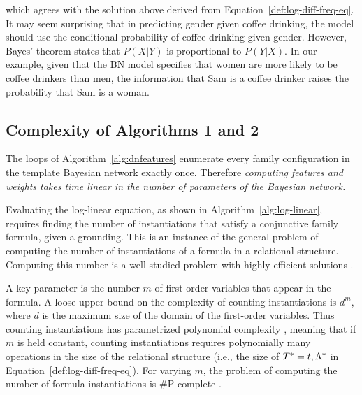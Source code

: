 \documentclass[runningheads,a4paper]{llncs}
\renewcommand{\Qconj}{\Appendterm{\FG{\TT} = \TV} {\QC}} %
\begin{document}
\noindent which agrees with the solution above derived from Equation~\eqref{def:log-diff-freq-eq}. It may seem surprising that in predicting gender given coffee drinking, the model should use the conditional probability of coffee drinking given gender. However, Bayes' theorem states that $P(X|Y)$ is proportional to $P(Y|X)$. In our example, given that the BN model specifies that women are more likely to be coffee drinkers than men, the information that Sam is a coffee drinker raises the probability that Sam is a woman. 

\subsection{Complexity of Algorithms 1 and 2} \label{sec:complexity}
The loops of Algorithm~\ref{alg:dnfeatures} enumerate every family configuration in the template Bayesian network exactly once. Therefore {\em computing features and weights takes time linear in the number of parameters of the Bayesian network.} 

Evaluating the log-linear equation, as shown in Algorithm~\ref{alg:log-linear}, requires finding the number of instantiations that satisfy a conjunctive family formula, given a grounding. This is an instance of the general problem of computing the number of instantiations of a formula in a relational structure. Computing this number is a well-studied problem  with highly efficient solutions \cite{Vardi1995,Schulte2014}. 

A key parameter is the number $m$ of first-order variables that appear in the formula. A loose upper bound on the complexity of counting instantiations is $d^{m}$, where $d$ is the maximum size of the domain of the first-order variables. Thus counting instantiations has parametrized polynomial complexity \cite{Flum2006}, meaning that if $m$ is held constant, counting instantiations requires polynomially many operations in the size of the relational structure (i.e., the size of $\Qconj$ in Equation~\eqref{def:log-diff-freq-eq}). For varying $m$, the problem of computing the number of formula instantiations is \#P-complete \cite[Prop.12.4]{Domingos2007}.


 
 
\end{document}
